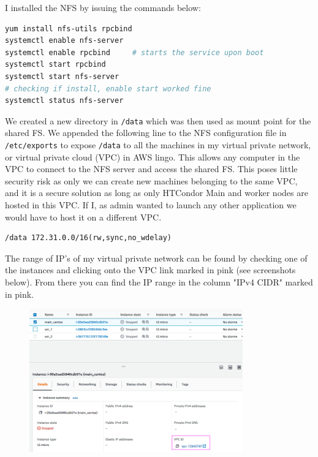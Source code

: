 \documentclass{article}
\begin{document}
I installed the NFS by issuing the commands below:
\begin{lstlisting}[language=bash]
yum install nfs-utils rpcbind
systemctl enable nfs-server
systemctl enable rpcbind     # starts the service upon boot
systemctl start rpcbind
systemctl start nfs-server
# checking if install, enable start worked fine
systemctl status nfs-server 
\end{lstlisting}

We created a new directory in \texttt{/data} which was then used as mount point for the shared FS. 
We appended the following line to the NFS configuration file in \texttt{/etc/exports} to expose \texttt{/data} to all the machines in my virtual private network, or virtual private cloud (VPC) in AWS lingo.
This allows any computer in the VPC to connect to the NFS server and access the shared FS.
This poses little security risk as only we can create new machines belonging to the same VPC, and it is a secure solution as long as only HTCondor Main and worker nodes are hosted in this VPC. 
If I, as admin wanted to launch any other application we would have to host it on a different VPC.
\begin{lstlisting}
/data 172.31.0.0/16(rw,sync,no_wdelay)
\end{lstlisting}
The range of IP's of my virtual private network can be found by checking one of the instances and clicking onto the VPC link marked in pink (see screenshots below). From there you can find the IP range in the column "IPv4 CIDR" marked in pink.
\begin{figure}[!h]
    \includegraphics[width=0.82\textwidth]{./img/find_vpc.png}
\end{figure}
\end{document}
